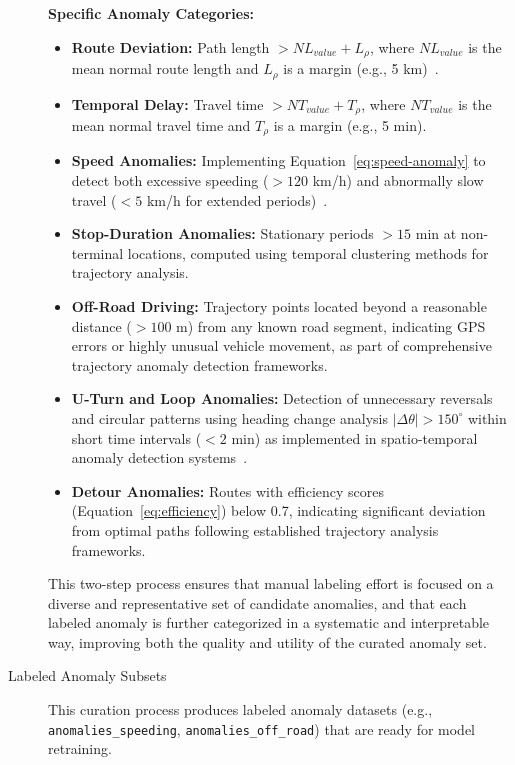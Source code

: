 \begin{description}
    \textbf{Specific Anomaly Categories:}
    \begin{itemize}[leftmargin=*]
      \item \textbf{Route Deviation:} Path length $> NL_{value} + L_\rho$, where $NL_{value}$ is the mean normal route length and $L_\rho$ is a margin (e.g., 5 km)~\cite{wangDetectingAnomalousTrajectories2018}.
      \item \textbf{Temporal Delay:} Travel time $> NT_{value} + T_\rho$, where $NT_{value}$ is the mean normal travel time and $T_\rho$ is a margin (e.g., 5 min).
      \item \textbf{Speed Anomalies:} Implementing Equation~\ref{eq:speed-anomaly} to detect both excessive speeding ($> 120$ km/h) and abnormally slow travel ($< 5$ km/h for extended periods)~\cite{heEnhancedDBSCANMultiple2020}.
      \item \textbf{Stop-Duration Anomalies:} Stationary periods $> 15$ min at non-terminal locations, computed using temporal clustering methods for trajectory analysis.
      \item \textbf{Off-Road Driving:} Trajectory points located beyond a reasonable distance ($> 100$ m) from any known road segment, indicating GPS errors or highly unusual vehicle movement, as part of comprehensive trajectory anomaly detection frameworks.
      \item \textbf{U-Turn and Loop Anomalies:} Detection of unnecessary reversals and circular patterns using heading change analysis $|\Delta\theta| > 150^{\circ}$ within short time intervals ($< 2$ min) as implemented in spatio-temporal anomaly detection systems~\cite{heEnhancedDBSCANMultiple2020}.
      \item \textbf{Detour Anomalies:} Routes with efficiency scores (Equation~\ref{eq:efficiency}) below 0.7, indicating significant deviation from optimal paths following established trajectory analysis frameworks.
    \end{itemize}
    This two-step process ensures that manual labeling effort is focused on a diverse and representative set of candidate anomalies, and that each labeled anomaly is further categorized in a systematic and interpretable way, improving both the quality and utility of the curated anomaly set.
  \item[Labeled Anomaly Subsets] This curation process produces labeled anomaly datasets (e.g., \texttt{anomalies\_speeding}, \texttt{anomalies\_off\_road}) that are ready for model retraining.
\end{description}

